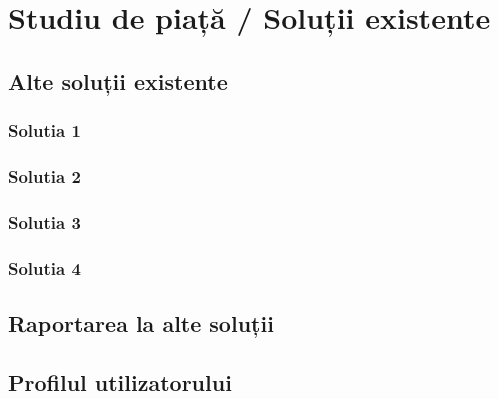 \chapter{Studiu de piață / Soluții existente}
\label{chapter:intro}

\section{Alte soluții existente}
\label{sec:proj}
\subsection{Solutia 1}
\subsection{Solutia 2}
\subsection{Solutia 3}
\subsection{Solutia 4}

\section{Raportarea la alte soluții}
\label{sub-sec:proj-scope}

\section{Profilul utilizatorului}
\label{sub-sec:proj-user-profile}


